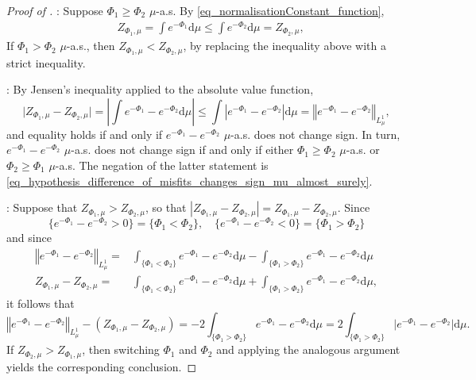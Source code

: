 \documentclass[10pt,a4paper]{amsart}
\newcommand{\Abs}[1]{\left\vert#1\right\vert}
\newcommand{\Norm}[1]{\left\Vert #1 \right\Vert}
\newcommand{\abs}[1]{\vert #1\vert}
\newcommand{\rd}{\mathrm{d}}
\begin{document}
\begin{proof}[Proof of ] 

: Suppose $\Phi_1\geq \Phi_2$ $\mu$-a.s. By \eqref{eq_normalisationConstant_function},
\begin{align*}
 &Z_{\Phi_1,\mu}=\int e^{-\Phi_1}\rd \mu\leq \int e^{-\Phi_2}\rd \mu=Z_{\Phi_2,\mu},
\end{align*}
If $\Phi_1>\Phi_2$ $\mu$-a.s., then $Z_{\Phi_1,\mu}<Z_{\Phi_2,\mu}$, by replacing the inequality above with a strict inequality.

: 
By Jensen's inequality applied to the absolute value function,
\begin{equation*}
 \abs{Z_{\Phi_1,\mu}-Z_{\Phi_2,\mu}}=\Abs{\int e^{-\Phi_1}-e^{-\Phi_2}\rd \mu}\leq \int \Abs{e^{-\Phi_1}-e^{-\Phi_2}}\rd \mu=\Norm{e^{-\Phi_1}-e^{-\Phi_2}}_{L^1_\mu},
\end{equation*}
and equality holds if and only if $e^{-\Phi_1}-e^{-\Phi_2}$ $\mu$-a.s. does not change sign. In turn, $e^{-\Phi_1}-e^{-\Phi_2}$ $\mu$-a.s. does not change sign if and only if either $\Phi_1\geq \Phi_2$ $\mu$-a.s. or $\Phi_2\geq \Phi_1$ $\mu$-a.s. The negation of the latter statement is \eqref{eq_hypothesis_difference_of_misfits_changes_sign_mu_almost_surely}.

: Suppose that $Z_{\Phi_1,\mu}>Z_{\Phi_2,\mu}$, so that $\Abs{Z_{\Phi_1,\mu}-Z_{\Phi_2,\mu}} =Z_{\Phi_1,\mu}-Z_{\Phi_2,\mu}$.
Since
\begin{equation*}
 \{e^{-\Phi_1}-e^{-\Phi_2}> 0\}=\{\Phi_1<\Phi_2\},\quad \{e^{-\Phi_1}-e^{-\Phi_2}< 0\}=\{\Phi_1> \Phi_2\}
\end{equation*}
and since
\begin{align*}
 \Norm{e^{-\Phi_1}-e^{-\Phi_2}}_{L^1_\mu}=&\int_{\{\Phi_1< \Phi_2\}}e^{-\Phi_1}-e^{-\Phi_2}\rd \mu- \int_{\{\Phi_1>\Phi_2\}}e^{-\Phi_1}-e^{-\Phi_2}\rd \mu
 \\
 Z_{\Phi_1,\mu}-Z_{\Phi_2,\mu}=&\int_{\{\Phi_1<\Phi_2\}}e^{-\Phi_1}-e^{-\Phi_2}\rd \mu+\int_{\{\Phi_1>\Phi_2\}}e^{-\Phi_1}-e^{-\Phi_2}\rd \mu,
\end{align*}
it follows that 
\begin{equation*}
 \Norm{e^{-\Phi_1}-e^{-\Phi_2}}_{L^1_\mu}-(Z_{\Phi_1,\mu}-Z_{\Phi_2,\mu})
=-2\int_{\{\Phi_1>\Phi_2\}}e^{-\Phi_1}-e^{-\Phi_2}\rd \mu =2\int_{\{\Phi_1>\Phi_2\}} \abs{e^{-\Phi_1}-e^{-\Phi_2}}\rd \mu.
 \end{equation*}
 If $Z_{\Phi_2,\mu}>Z_{\Phi_1,\mu}$, then switching $\Phi_1$ and $\Phi_2$ and applying the analogous argument yields the corresponding conclusion.
 \end{proof}
\end{document}
